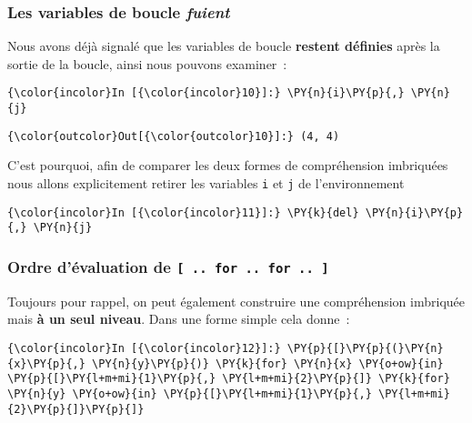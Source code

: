    \hypertarget{les-variables-de-boucle-fuient}{%
\subsubsection{\texorpdfstring{Les variables de boucle
\emph{fuient}}{Les variables de boucle fuient}}\label{les-variables-de-boucle-fuient}}

    Nous avons déjà signalé que les variables de boucle \textbf{restent
définies} après la sortie de la boucle, ainsi nous pouvons examiner~:

    \begin{Verbatim}[commandchars=\\\{\},frame=single,framerule=0.3mm,rulecolor=\color{cellframecolor}]
{\color{incolor}In [{\color{incolor}10}]:} \PY{n}{i}\PY{p}{,} \PY{n}{j}
\end{Verbatim}


\begin{Verbatim}[commandchars=\\\{\},frame=single,framerule=0.3mm,rulecolor=\color{cellframecolor}]
{\color{outcolor}Out[{\color{outcolor}10}]:} (4, 4)
\end{Verbatim}
            
    C'est pourquoi, afin de comparer les deux formes de compréhension
imbriquées nous allons explicitement retirer les variables \texttt{i} et
\texttt{j} de l'environnement

    \begin{Verbatim}[commandchars=\\\{\},frame=single,framerule=0.3mm,rulecolor=\color{cellframecolor}]
{\color{incolor}In [{\color{incolor}11}]:} \PY{k}{del} \PY{n}{i}\PY{p}{,} \PY{n}{j}
\end{Verbatim}


    \hypertarget{ordre-duxe9valuation-de-..-for-..-for-..}{%
\subsubsection{\texorpdfstring{Ordre d'évaluation de
\texttt{{[}\ ..\ for\ ..\ for\ ..\ {]}}}{Ordre d'évaluation de {[} .. for .. for .. {]}}}\label{ordre-duxe9valuation-de-..-for-..-for-..}}

    Toujours pour rappel, on peut également construire une compréhension
imbriquée mais \textbf{à un seul niveau}. Dans une forme simple cela
donne~:

    \begin{Verbatim}[commandchars=\\\{\},frame=single,framerule=0.3mm,rulecolor=\color{cellframecolor}]
{\color{incolor}In [{\color{incolor}12}]:} \PY{p}{[}\PY{p}{(}\PY{n}{x}\PY{p}{,} \PY{n}{y}\PY{p}{)} \PY{k}{for} \PY{n}{x} \PY{o+ow}{in} \PY{p}{[}\PY{l+m+mi}{1}\PY{p}{,} \PY{l+m+mi}{2}\PY{p}{]} \PY{k}{for} \PY{n}{y} \PY{o+ow}{in} \PY{p}{[}\PY{l+m+mi}{1}\PY{p}{,} \PY{l+m+mi}{2}\PY{p}{]}\PY{p}{]}
\end{Verbatim}


